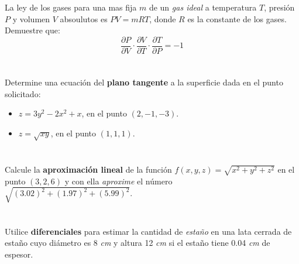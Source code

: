 \documentclass[12pt]{article}
\begin{document}
La ley de los gases para una mas fija $m$ de un \textit{gas ideal} a temperatura $T$, presión $P$ y volumen $V$ absoulutos es $P V = mRT$, donde $R$ es la constante de los gases. Demuestre que:
$$\frac{\partial P}{\partial V} \cdot \frac{\partial V}{\partial T} \cdot \frac{\partial T}{\partial P} = -1$$

\section{}

Determine una ecuación del \textbf{plano tangente} a la superficie dada en el punto solicitado:

\begin{itemize}[format=\textbf]

\item $z=3y^2-2x^2+x$, en el punto $(2,-1,-3)$.

\item $z=\sqrt{xy}$, en el punto $(1,1,1)$.

\end{itemize}

\section{}

Calcule la \textbf{aproximación lineal} de la función $f(x,y,z)=\sqrt{x^2+y^2+z^2}$ en el punto $(3,2,6)$ y con ella \textit{aproxime} el número $\sqrt{(3.02)^2+(1.97)^2+(5.99)^2}$.

\section{}

Utilice \textbf{diferenciales} para estimar la cantidad de \textit{estaño} en una lata cerrada de estaño cuyo diámetro es 8 \textit{cm} y altura 12 \textit{cm} si el estaño tiene
0.04 \textit{cm} de espesor.

\section{}
\end{document}
